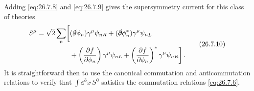 Adding \eqref{eq:26.7.8} and \eqref{eq:26.7.9} gives the supersymmetry
current for this class of theories
\begin{equation}
  \begin{aligned}
  S^\mu=\sqrt{2}\sum_n\biggl[
    &(\sl{\partial}\phi_n)\gamma^\mu\psi_{nR}
     +(\sl{\partial}\phi_n^*)\gamma^\mu\psi_{nL}
  \\
    &+\left(\frac{\partial f}{\partial\phi_n}\right)
      \gamma^\mu\psi_{nL}
     +\left(\frac{\partial f}{\partial\phi_n}\right)^*
      \gamma^\mu\psi_{nR}
  \biggr]\,.
  \end{aligned}
  \tag{26.7.10}\label{eq:26.7.10}
\end{equation}
It is straightforward then to use the canonical commutation and
anticommutation relations to verify that \(\int \dd^3x\,S^0\) satisfies the
commutation relations \eqref{eq:26.7.6}.


